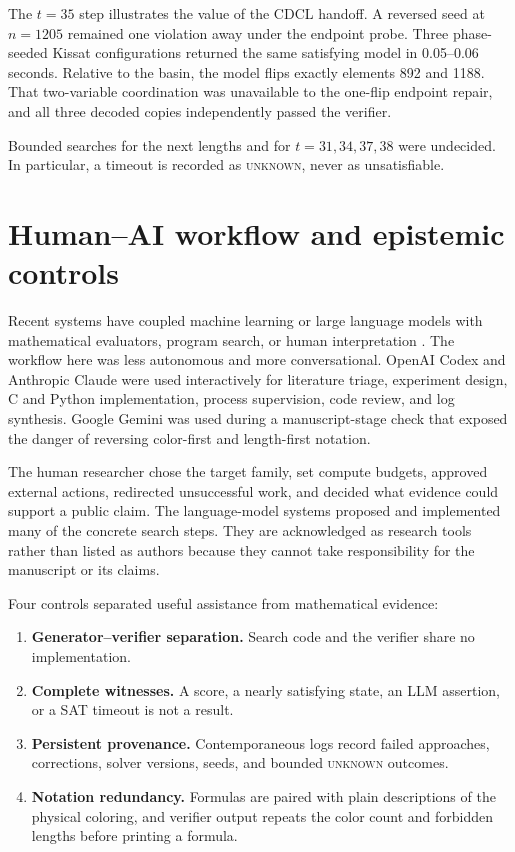\documentclass[11pt]{article}
\begin{document}
The \(t=35\) step illustrates the value of the CDCL handoff.  A reversed
seed at \(n=1205\) remained one violation away under the endpoint probe.
Three phase-seeded Kissat configurations returned the same satisfying model
in 0.05--0.06 seconds.  Relative to the basin, the model flips exactly
elements 892 and 1188.  That two-variable coordination was unavailable to
the one-flip endpoint repair, and all three decoded copies independently
passed the verifier.

Bounded searches for the next lengths and for \(t=31,34,37,38\) were
undecided.  In particular, a timeout is recorded as \textsc{unknown}, never
as unsatisfiable.

\section{Human--AI workflow and epistemic controls}
\label{sec:ai}

Recent systems have coupled machine learning or large language models with
mathematical evaluators, program search, or human interpretation
\cite{davies2021,romeraparedes2024,novikov2025}.  The workflow here was less
autonomous and more conversational.  OpenAI Codex and Anthropic Claude were
used interactively for literature triage, experiment design, C and Python
implementation, process supervision, code review, and log synthesis.  Google
Gemini was used during a manuscript-stage check that exposed the danger of
reversing color-first and length-first notation.

The human researcher chose the target family, set compute budgets, approved
external actions, redirected unsuccessful work, and decided what evidence
could support a public claim.  The language-model systems proposed and
implemented many of the concrete search steps.  They are acknowledged as
research tools rather than listed as authors because they cannot take
responsibility for the manuscript or its claims.

Four controls separated useful assistance from mathematical evidence:

\begin{enumerate}[leftmargin=*]
  \item \textbf{Generator--verifier separation.}  Search code and the
        verifier share no implementation.
  \item \textbf{Complete witnesses.}  A score, a nearly satisfying state,
        an LLM assertion, or a SAT timeout is not a result.
  \item \textbf{Persistent provenance.}  Contemporaneous logs record failed
        approaches, corrections, solver versions, seeds, and bounded
        \textsc{unknown} outcomes.
  \item \textbf{Notation redundancy.}  Formulas are paired with plain
        descriptions of the physical coloring, and verifier output repeats
        the color count and forbidden lengths before printing a formula.
\end{enumerate}
\end{document}
